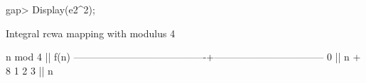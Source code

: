 gap> Display(e2^2);

Integral rcwa mapping with modulus 4

               n mod 4                  ||              f(n)              
----------------------------------------+---------------------------------
  0                                     || n + 8
  1 2 3                                 || n

\endexample

